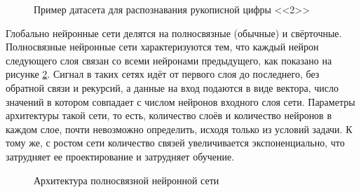\begin{figure}[ht]
	\caption{Пример датасета для распознавания рукописной цифры <<2>>}\label{fig:dataset-2}
\end{figure}

Глобально нейронные сети делятся на полносвязные (обычные) и свёрточные. Полносвязные нейронные сети характеризуются тем, что каждый нейрон следующего слоя связан со всеми нейронами предыдущего, как показано на рисунке \cref{fig:pns-arch}. Сигнал в таких сетях идёт от первого слоя до последнего, без обратной связи и рекурсий, а данные на вход подаются в виде вектора, число значений в котором совпадает с числом нейронов входного слоя сети. Параметры архитектуры такой сети, то есть, количество слоёв и количество нейронов в каждом слое, почти невозможно определить, исходя только из условий задачи. К тому же, с ростом сети количество связей увеличивается экспоненциально, что затрудняет ее проектирование и затрудняет обучение.

\begin{figure}[ht]
	\caption{Архитектура полносвязной нейронной сети}\label{fig:pns-arch}
\end{figure}

